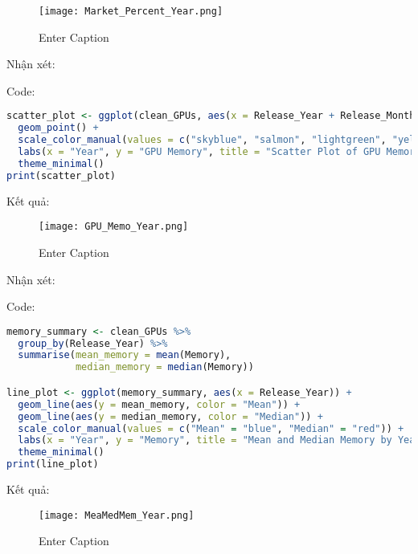 \begin{figure}[h]
  \centering
  \texttt{[image: Market\_Percent\_Year.png]}
  \vspace{1pt}
  \caption{Enter Caption}
  \label{fig:enter-label}
\end{figure}

Nhận xét:

\newpage
Code:
\begin{lstlisting}[language=R]
scatter_plot <- ggplot(clean_GPUs, aes(x = Release_Year + Release_Month/12, y = Memory, color = Manufacturer)) +
  geom_point() +
  scale_color_manual(values = c("skyblue", "salmon", "lightgreen", "yellow")) +
  labs(x = "Year", y = "GPU Memory", title = "Scatter Plot of GPU Memory vs Year") +
  theme_minimal()
print(scatter_plot)
\end{lstlisting}
Kết quả:

\begin{figure}[h]
  \centering
  \texttt{[image: GPU\_Memo\_Year.png]}
  \vspace{1pt}
  \caption{Enter Caption}
  \label{fig:enter-label}
\end{figure}

Nhận xét:

\newpage
Code:
\begin{lstlisting}[language=R]
memory_summary <- clean_GPUs %>%
  group_by(Release_Year) %>%
  summarise(mean_memory = mean(Memory),
            median_memory = median(Memory))

line_plot <- ggplot(memory_summary, aes(x = Release_Year)) +
  geom_line(aes(y = mean_memory, color = "Mean")) +
  geom_line(aes(y = median_memory, color = "Median")) +
  scale_color_manual(values = c("Mean" = "blue", "Median" = "red")) +
  labs(x = "Year", y = "Memory", title = "Mean and Median Memory by Year") +
  theme_minimal()
print(line_plot)
\end{lstlisting}
Kết quả:

\begin{figure}[h]
  \centering
  \texttt{[image: MeaMedMem\_Year.png]}
  \vspace{1pt}
  \caption{Enter Caption}
  \label{fig:enter-label}
\end{figure}

